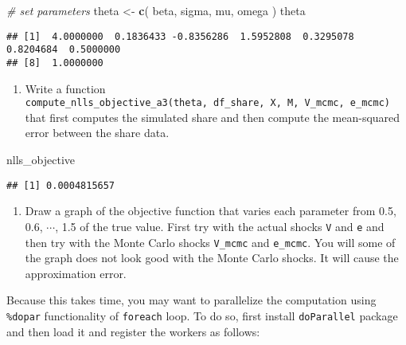 \documentclass[
]{book}
\newenvironment{Shaded}{\begin{snugshade}}{\end{snugshade}}
\newcommand{\CommentTok}[1]{\textcolor[rgb]{0.56,0.35,0.01}{\textit{#1}}}
\newcommand{\FunctionTok}[1]{\textcolor[rgb]{0.13,0.29,0.53}{\textbf{#1}}}
\newcommand{\NormalTok}[1]{#1}
\newcommand{\OtherTok}[1]{\textcolor[rgb]{0.56,0.35,0.01}{#1}}
\providecommand{\tightlist}{%
  \setlength{\itemsep}{0pt}\setlength{\parskip}{0pt}}
\begin{document}
\begin{Shaded}
\begin{Highlighting}[]
\CommentTok{\# set parameters}
\NormalTok{theta }\OtherTok{\textless{}{-}} 
  \FunctionTok{c}\NormalTok{(}
\NormalTok{    beta, }
\NormalTok{    sigma, }
\NormalTok{    mu, }
\NormalTok{    omega}
\NormalTok{    )}
\NormalTok{theta}
\end{Highlighting}
\end{Shaded}

\begin{verbatim}
## [1]  4.0000000  0.1836433 -0.8356286  1.5952808  0.3295078  0.8204684  0.5000000
## [8]  1.0000000
\end{verbatim}

\begin{enumerate}
\def\labelenumi{\arabic{enumi}.}
\setcounter{enumi}{5}
\tightlist
\item
  Write a function \texttt{compute\_nlls\_objective\_a3(theta,\ df\_share,\ X,\ M,\ V\_mcmc,\ e\_mcmc)} that first computes the simulated share and then compute the mean-squared error between the share data.
\end{enumerate}

\begin{Shaded}
\begin{Highlighting}[]
\NormalTok{nlls\_objective}
\end{Highlighting}
\end{Shaded}

\begin{verbatim}
## [1] 0.0004815657
\end{verbatim}

\begin{enumerate}
\def\labelenumi{\arabic{enumi}.}
\setcounter{enumi}{6}
\tightlist
\item
  Draw a graph of the objective function that varies each parameter from 0.5, 0.6, \(\cdots\), 1.5 of the true value. First try with the actual shocks \texttt{V} and \texttt{e} and then try with the Monte Carlo shocks \texttt{V\_mcmc} and \texttt{e\_mcmc}. You will some of the graph does not look good with the Monte Carlo shocks. It will cause the approximation error.
\end{enumerate}

Because this takes time, you may want to parallelize the computation using \texttt{\%dopar} functionality of \texttt{foreach} loop. To do so, first install \texttt{doParallel} package and then load it and register the workers as follows:
\end{document}
